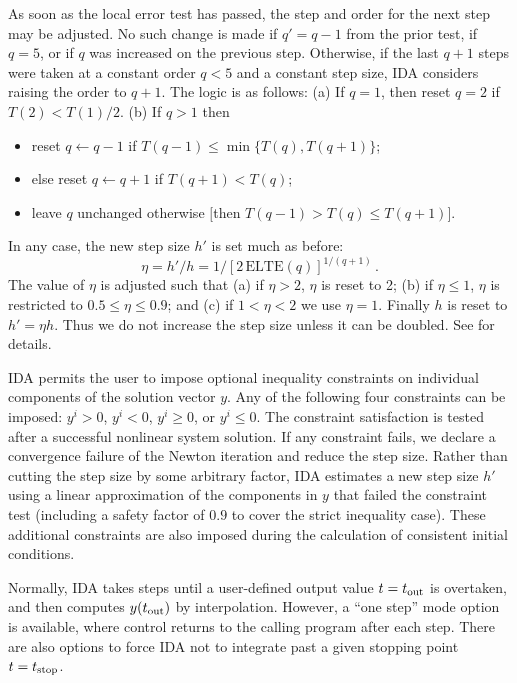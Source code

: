 As soon as the local error test has passed, the step and order for the
next step may be adjusted.  No such change is made if $q' = q-1$ from
the prior test, if $q = 5$, or if $q$ was increased on the previous
step.  Otherwise, if the last $q+1$ steps were taken at a constant
order $q < 5$ and a constant step size, IDA considers raising the order
to $q+1$.  The logic is as follows: (a) If $q = 1$, then reset $q = 2$
if $T(2) < T(1)/2$.  (b) If $q > 1$ then 
\begin{itemize}
\item reset $q \leftarrow q-1$ if $T(q-1) \leq \min\{T(q),T(q+1)\}$;
\item else reset $q \leftarrow q+1$ if $T(q+1) < T(q)$;
\item leave $q$ unchanged otherwise $[$then $T(q-1) > T(q) \leq T(q+1)]$.
\end{itemize}
In any case, the new step size $h'$ is set much as before:
\[ \eta = h'/h = 1/[2 \, \mbox{ELTE}(q)]^{1/(q+1)} \, . \]
The value of $\eta$ is adjusted such that (a) if $\eta > 2$, $\eta$ is
reset to 2; (b) if $\eta \leq 1$, $\eta$ is restricted to 
$0.5 \leq \eta \leq 0.9$; and (c) if $1 < \eta < 2$ we use $\eta = 1$.
Finally $h$ is reset to $h' = \eta h$.  Thus we do not increase the
step size unless it can be doubled.  See \cite{BCP:96} for details.

IDA permits the user to impose optional inequality constraints on individual 
components of the solution vector $y$. Any of the following four constraints 
can be imposed: $y^i > 0$, $y^i < 0$, $y^i \geq 0$, or $y^i \leq 0$. 
The constraint satisfaction is tested after a successful nonlinear system solution. 
If any constraint fails, we declare a convergence failure of the Newton iteration 
and reduce the step size. Rather than cutting the step size by some arbitrary factor, 
IDA estimates a new step size $h'$ using a linear approximation of the components 
in $y$ that failed the constraint test (including a safety factor of $0.9$ to 
cover the strict inequality case). These additional constraints are also imposed
during the calculation of consistent initial conditions.

Normally, IDA takes steps until a user-defined output value $t =
t_{\mbox{\scriptsize out}}$ is overtaken, and then computes
$y(t_{\mbox{\scriptsize out}})$ by interpolation.  However, a
``one step'' mode option is available, where control returns to the
calling program after each step.  There are also options to force IDA
not to integrate past a given stopping point $t = t_{\mbox{\scriptsize
stop}}$.
